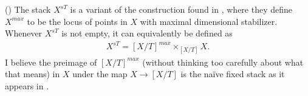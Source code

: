 \begin{remark}\label{rl-001F}
(\cite[Remark A.44]{aranha-khan-latyntsev-etal_VirtualLocalizationRevisited2025})
  The stack \(X^{sT}\) is a variant of the construction found in \cite[Proposition C.5]{edidin-rydh_CanonicalReductionStabilizers2021}, where they define \(X^{max}\) to be the locus of points in \(X\) with maximal dimensional stabilizer. Whenever \(X^{sT}\) is not empty, it can equivalently be defined as
  \begin{align*}
    X^{sT} = [X/T]^{max} \times_{[X/T]} X.
  \end{align*}
  I believe the preimage of \([X/T]^{max}\) (without thinking too carefully about what that means) in \(X\) under the map \(X\to [X/T]\) is the na\"ive fixed stack as it appears in \cite{graber-pandharipande_LocalizationVirtualClasses1999}.
\end{remark}

